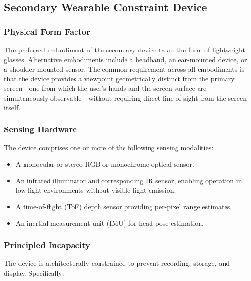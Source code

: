 \documentclass[11pt,letterpaper]{article}
\begin{document}
\subsection{Secondary Wearable Constraint Device}

\subsubsection{Physical Form Factor}

The preferred embodiment of the secondary device takes the form of lightweight
glasses. Alternative embodiments include a headband, an ear-mounted device, or a
shoulder-mounted sensor. The common requirement across all embodiments is that the
device provides a viewpoint geometrically distinct from the primary screen---one from
which the user's hands and the screen surface are simultaneously observable---without
requiring direct line-of-sight from the screen itself.

\subsubsection{Sensing Hardware}

The device comprises one or more of the following sensing modalities:

\begin{itemize}[leftmargin=2em]
  \item A monocular or stereo RGB or monochrome optical sensor.
  \item An infrared illuminator and corresponding IR sensor, enabling operation in
        low-light environments without visible light emission.
  \item A time-of-flight (ToF) depth sensor providing per-pixel range estimates.
  \item An inertial measurement unit (IMU) for head-pose estimation.
\end{itemize}

\subsubsection{Principled Incapacity}

The device is architecturally constrained to prevent recording, storage, and display.
Specifically:
\end{document}
